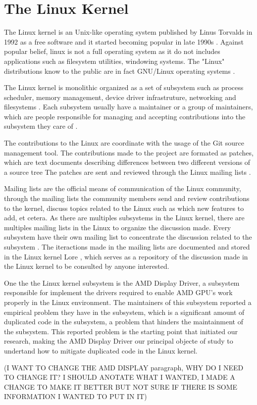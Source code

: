 \en

\section{The Linux Kernel}

The Linux kernel is an Unix-like operating system published by Linus Torvalds in 1992 as a free software and
it started becoming popular in late 1990s \citep{linuxbook}. Against popular belief, linux is not a full 
operating system as it do not includes applications such as filesystem utilities, windowing systems. The "Linux" 
distributions know to the public are in fact GNU/Linux operating systems \citep{gnuref}.

The Linux kernel is monolithic organized as a set of subsystem such as process scheduler, memory management, 
device driver infrastruture, networking and filesystems \citep{melissa}.
Each subsystem usually have a maintainer or a group of maintainers, which are people responsible 
for managing and accepting contributions into the subsystem they care of \citep{melissa}. 

The contributions to the Linux are coordinate with the usage of the Git source management tool. The contributions 
made to the project are formated as patches, which are text documents describing differences between two different 
versions of a source tree  The patches are sent and reviewed through the Linux mailing lists \citep{melissa}.

Mailing lists are the official means of communication of the Linux community, through the mailing lists the community members 
send and review
contributions to the kernel, discuss topics related to the Linux such as which new features to add, et cetera. 
As there are multiples
subsystems in the Linux kernel, there are multiples mailing lists in the Linux to organize the discussion made. Every subsystem 
have their own mailing list to concentrate the discussion related to the subsystem \citep{melissa}. The iteractions made in the
mailing lists are documented and stored in the Linux kernel Lore \citep{linuxlore}, which serves as a repository of the
discussion made in the Linux kernel to be consulted by anyone interested.

One the the Linux kernel subsystem is the AMD Display Driver, a subsystem responsible for implement the drivers required to enable
AMD GPU's work properly in the Linux environment. The maintainers of this subsystem reported a empirical problem they have in
the subsystem, which is a significant amount of duplicated code in the subsystem, a problem that hinders the maintainment of the
subsystem. This reported problem is the starting point that initiated our research, making the AMD Display Driver our principal
objecte of study to undertand how to mitigate duplicated code in the Linux kernel.


(I WANT TO CHANGE THE AMD DISPLAY paragraph, WHY DO I NEED TO CHANGE IT? I SHOULD ANOTATE WHAT I WANTED, I MADE A CHANGE
 TO MAKE IT BETTER BUT NOT SURE IF THERE IS SOME INFORMATION I WANTED TO PUT IN IT)

